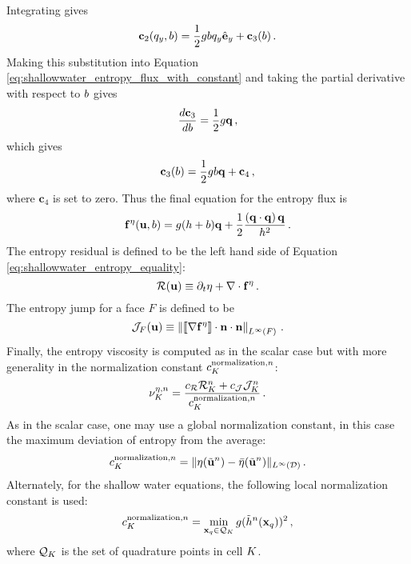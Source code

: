 Integrating gives
\begin{equation}
  \mathbf{c}_2(q_y,b)
  = \frac{1}{2}gbq_y\hat{\mathbf{e}}_y
  + \mathbf{c}_3(b)
  \,.
\end{equation}
Making this substitution into Equation
\eqref{eq:shallowwater_entropy_flux_with_constant}
and taking the partial derivative with respect to $b$
gives
\begin{equation}
  \frac{d \mathbf{c}_3}{d b} = \frac{1}{2}g\mathbf{q} \,,
\end{equation}
which gives
\begin{equation}
  \mathbf{c}_3(b) = \frac{1}{2}gb\mathbf{q}
  + \mathbf{c}_4 \,,
\end{equation}
where $\mathbf{c}_4$ is set to zero.
Thus the final equation for the entropy flux is
\begin{equation}
  \mathbf{f}^\eta(\mathbf{u},b)
  = g(h + b)\mathbf{q}
  + \frac{1}{2}\frac{\left(\mathbf{q}\cdot\mathbf{q}\right)\mathbf{q}} 
  {h^2}
  \,.
\end{equation}
The entropy residual is defined to be the left hand side of 
Equation \eqref{eq:shallowwater_entropy_equality}:
\begin{equation}
  \mathcal{R}(\mathbf{u}) \equiv \partial_t\eta
  + \nabla\cdot\mathbf{f}^\eta
  \,.
\end{equation}
The entropy jump for a face $F$ is defined to be
\begin{equation}
  \mathcal{J}_F(\mathbf{u})
  \equiv \left\|
    \left\llbracket\nabla\mathbf{f}^\eta\right\rrbracket
    \cdot\mathbf{n}\cdot\mathbf{n}
  \right\|_{L^\infty(F)} \,.
\end{equation}
Finally, the entropy viscosity is computed as in the scalar case but with
more generality in the normalization constant $c^{\text{normalization},n}_K$:
\begin{equation}
   \entropycellviscosity[n] = \frac{\entropyresidualcoef
   \entropyresidual_\cellindex^\timeindex
   + \entropyjumpcoef\entropyjump_\cell^\timeindex}
   {c^{\text{normalization},\timeindex}_\cell}
   \eqp
\end{equation}
As in the scalar case, one may use a global normalization constant, in this case
the maximum deviation of entropy from the average:
\begin{equation}
  c^{\text{normalization},n}_K = \|\eta(\tilde{\mathbf{u}}^n)
   -\bar{\eta}(\tilde{\mathbf{u}}^n)\|_{L^\infty(\mathcal{D})}
  \,.
\end{equation}
Alternately, for the shallow water equations, the following local normalization
constant is used:
\begin{equation}
  c^{\text{normalization},n}_K
  = \min\limits_{\mathbf{x}_q\in\mathcal{Q}_K} g (\tilde{h}^n(\mathbf{x}_q))^2
  \,,
\end{equation}
where $\mathcal{Q}_K$ is the set of quadrature points in cell $K$.

